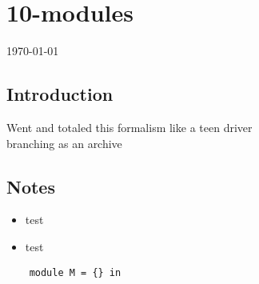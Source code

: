 \documentclass[12pt]{article}
\begin{document}
\section*{10-modules}
\today
\subsection*{Introduction}
Went and totaled this formalism like a teen driver \\
branching as an archive
\subsection*{Notes}
\begin{itemize}
    \item test
    \item test
\end{itemize}
\begin{verbatim}
    module M = {} in
\end{verbatim}
\end{document}
